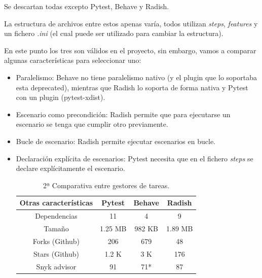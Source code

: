 Se descartan todas excepto Pytest, Behave y Radish.

La estructura de archivos entre estos apenas varía, todos utilizan \textit{steps}, \textit{features} y un fichero \textit{.ini} (el cual puede ser utilizado para cambiar la estructura).

En este punto los tres son válidos en el proyecto, sin embargo, vamos a comparar algunas características para seleccionar uno:

\begin{itemize}
    \item Paralelismo: Behave no tiene paralelismo nativo (y el plugin que lo soportaba esta deprecated), mientras que Radish lo soporta de forma nativa y Pytest con un plugin (pytest-xdist).
    \item Escenario como precondición: Radish permite que para ejecutarse un escenario se tenga que cumplir otro previamente.
    \item Bucle de escenario: Radish permite ejecutar escenarios en bucle.
    \item Declaración explícita de escenarios: Pytest necesita que en el fichero \textit{steps} se declare explícitamente el escenario.
    \begin{table}[H]
        \centering
        \begin{adjustbox}{width=\textwidth, totalheight=\textheight, keepaspectratio}
            \begin{tabular}{|c|c|c|c|}
            \hline
            Otras características & Pytest & Behave & Radish \\
            \hline
            Dependencias & 11 & 4 & 9 \\
            \hline
            Tamaño & 1.25 MB & 982 KB & 1.89 MB \\
            \hline
            Forks (Github) & 206 & 679 & 48 \\
            \hline
            Stars (Github) & 1.2 K & 3 K & 176 \\
            \hline
            Snyk advisor  & 91 & 71* & 87 \\
            \hline
            \end{tabular}
        \end{adjustbox}
            \caption{2ª Comparativa entre gestores de tareas.}
    \end{table}
\end{itemize}


